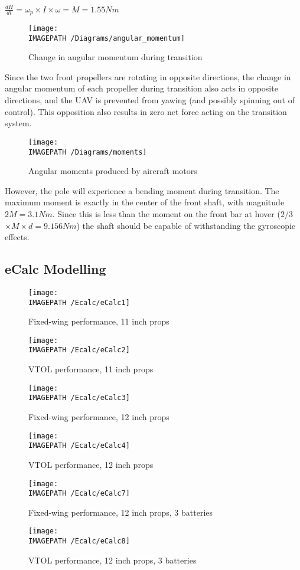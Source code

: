 $\frac{dH}{dt} = \omega_p \times I \times \omega = M = 1.55Nm$\\

\begin{figure}[!ht]
	\centering
	\texttt{[image: \\IMAGEPATH /Diagrams/angular\_momentum]}
	\caption{Change in angular momentum during transition}
	\label{fig:momentum}
\end{figure}

Since the two front propellers are rotating in opposite directions, the change in angular momentum of each propeller during transition also acts in opposite directions, and the UAV is prevented from yawing (and possibly spinning out of control). This opposition also results in zero net force acting on the transition system.\\

\begin{figure}[!ht]
	\centering
	\texttt{[image: \\IMAGEPATH /Diagrams/moments]}
	\caption{Angular moments produced by aircraft motors}
	\label{fig:moments}
\end{figure}

However, the pole will experience a bending moment during transition. The maximum moment is exactly in the center of the front shaft, with magnitude $2M = 3.1Nm$. Since this is less than the moment on the front bar at hover ($2/3$ $\times M \times d = 9.156Nm$) the shaft should be capable of withstanding the gyroscopic effects.\\

\subsection{eCalc Modelling}
\label{sec:ecalc}
\begin{figure}[H]
	\centering
	\texttt{[image: \\IMAGEPATH /Ecalc/eCalc1]}
	\caption{Fixed-wing performance, 11 inch props}
\end{figure}
\begin{figure}[H]
	\centering
	\texttt{[image: \\IMAGEPATH /Ecalc/eCalc2]}
	\caption{VTOL performance, 11 inch props}
\end{figure}
\begin{figure}[H]
	\centering
	\texttt{[image: \\IMAGEPATH /Ecalc/eCalc3]}
	\caption{Fixed-wing performance, 12 inch props}
	\label{fig:fixed}
\end{figure}
\begin{figure}[H]
	\centering
	\texttt{[image: \\IMAGEPATH /Ecalc/eCalc4]}
	\caption{VTOL performance, 12 inch props}
	\label{fig:vtol}
\end{figure}
\begin{figure}[H]
	\centering
	\texttt{[image: \\IMAGEPATH /Ecalc/eCalc7]}
	\caption{Fixed-wing performance, 12 inch props, 3 batteries}
\end{figure}
\begin{figure}[H]
	\centering
	\texttt{[image: \\IMAGEPATH /Ecalc/eCalc8]}
	\caption{VTOL performance, 12 inch props, 3 batteries}
\end{figure}

